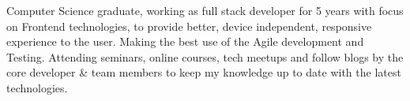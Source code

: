 Computer Science graduate, working as full stack developer for 5 years with focus on Frontend technologies, to provide better, device independent, responsive experience to the user. Making the best use of the Agile development and Testing. Attending seminars, online courses, tech meetups and follow blogs by the core developer \& team members to keep my knowledge up to date with the latest technologies.